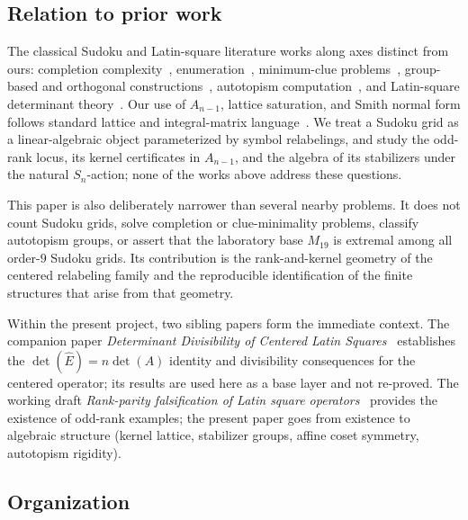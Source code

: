 \documentclass[11pt,a4paper]{article}
\theoremstyle{definition}
\theoremstyle{remark}
\begin{document}
\subsection{Relation to prior work}\label{sec:intro-prior-work}

The classical Sudoku and Latin-square literature works along axes
distinct from ours: completion complexity~\cite{Colbourn84},
enumeration~\cite{FelgenhauerJarvis06,RussellJarvis06}, minimum-clue
problems~\cite{McGuireTugemannCivario14}, group-based and orthogonal
constructions~\cite{SudokuPairsGroups22,Wanless11}, autotopism
computation~\cite{SVW12,AutotopismsPartialLatin20}, and Latin-square
determinant theory~\cite{FordJohnson96,DJW16,LatinSquareDetII92,DK91}.
Our use of $A_{n-1}$, lattice saturation, and Smith normal form follows
standard lattice and integral-matrix language~\cite{ConwaySloaneSPLAG,Newman72}.
We treat a Sudoku grid as a linear-algebraic object parameterized by
symbol relabelings, and study the odd-rank locus, its kernel
certificates in $A_{n-1}$, and the algebra of its stabilizers under
the natural $S_n$-action; none of the works above address these
questions.

This paper is also deliberately narrower than several nearby problems.
It does not count Sudoku grids, solve completion or clue-minimality
problems, classify autotopism groups, or assert that the laboratory base
$M_{19}$ is extremal among all order-$9$ Sudoku grids.  Its contribution
is the rank-and-kernel geometry of the centered relabeling family and
the reproducible identification of the finite structures that arise
from that geometry.

Within the present project, two sibling papers form the immediate
context. The companion paper \emph{Determinant Divisibility of
Centered Latin Squares}~\cite{HAN-DetDivisibility} establishes the
$\det(\widehat{E}) = n \det(A)$ identity and divisibility consequences
for the centered operator; its results are used here as a base layer
and not re-proved. The working draft \emph{Rank-parity falsification
of Latin square operators}~\cite{HAN-RankParity} provides the
existence of odd-rank examples; the present paper goes from existence
to algebraic structure (kernel lattice, stabilizer groups, affine
coset symmetry, autotopism rigidity).

\subsection{Organization}\label{sec:intro-organization}
\end{document}
